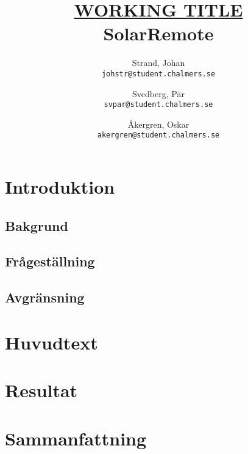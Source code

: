 \documentclass{article}
\author{	Strand, Johan \\ \texttt{johstr@student.chalmers.se} \and
			Svedberg, Pär\\ \texttt{svpar@student.chalmers.se} \and
			Åkergren, Oskar\\ \texttt{akergren@student.chalmers.se}
}
\title{\underline{\small{WORKING TITLE}} \\ SolarRemote}
\begin{document}
	\maketitle
	\thispagestyle{empty}

	\newpage 
	\section{Introduktion} %
	\label{sec:introduktion}

		\subsection{Bakgrund} %
		\label{sub:bakgrund}


		\subsection{Frågeställning} %
		\label{sub:fragestallning}
		

		\subsection{Avgränsning} %
		\label{sub:avgransning}
		

	\section{Huvudtext} %
	\label{sec:huvudtext}


	\section{Resultat} %
	\label{sec:resultat}


	\section{Sammanfattning} %
	\label{sec:sammanfattning}




	\printbibliography		
\end{document}
